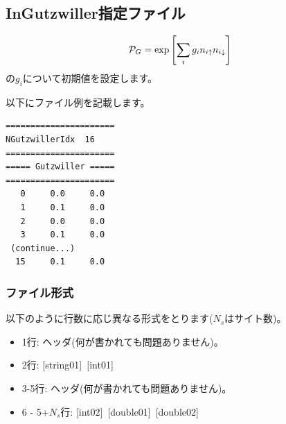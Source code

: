 \newpage
\subsection{InGutzwiller指定ファイル}
\label{Subsec:InGutzwiller}
\begin{equation}
{\cal P}_G=\exp\left[ \sum_i g_i n_{i\uparrow} n_{i\downarrow} \right]
\end{equation}
の$g_i$について初期値を設定します。

以下にファイル例を記載します。

\begin{minipage}{12.5cm}
\begin{screen}
\begin{verbatim}
======================
NGutzwillerIdx  16  
====================== 
===== Gutzwiller ===== 
====================== 
   0     0.0     0.0
   1     0.1     0.0
   2     0.0     0.0
   3     0.1     0.0
 (continue...)
  15     0.1     0.0
\end{verbatim}
\end{screen}
\end{minipage}

\subsubsection{ファイル形式}
以下のように行数に応じ異なる形式をとります($N_s$はサイト数)。
 \begin{itemize}
   \item  1行:  ヘッダ(何が書かれても問題ありません)。
   \item  2行:   [string01]~[int01]
   \item  3-5行:  ヘッダ(何が書かれても問題ありません)。
   \item  6 - 5+$N_s$行: [int02]~[double01]~[double02]
  \end{itemize}
